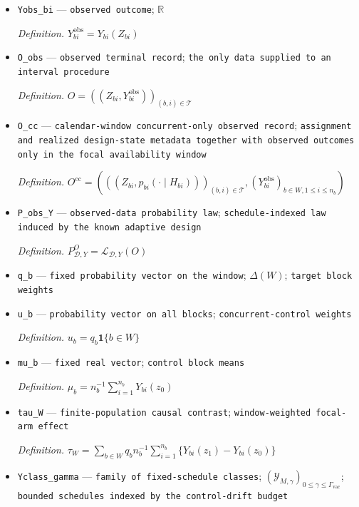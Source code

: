 \documentclass{article}
\begin{document}
\begin{itemize}
  \item \texttt{Yobs\_\allowbreak{}bi} --- \texttt{observed outcome}; \(\mathbb R\)
  \par\smallskip\noindent\emph{Definition.} \(Y^{\mathrm{obs}}_{bi}=Y_{bi}(Z_{bi})\)
  \item \texttt{O\_\allowbreak{}obs} --- \texttt{observed terminal record}; \texttt{the only data supplied to an interval procedure}
  \par\smallskip\noindent\emph{Definition.} \(O=((Z_{bi},Y^{\mathrm{obs}}_{bi}))_{(b,i)\in\mathcal T}\)
  \item \texttt{O\_\allowbreak{}cc} --- \texttt{calendar-\allowbreak{}window concurrent-\allowbreak{}only observed record}; \texttt{assignment and realized design-\allowbreak{}state metadata together with observed outcomes only in the focal availability window}
  \par\smallskip\noindent\emph{Definition.} \(O^{\mathrm{cc}}=(((Z_{bi},p_{bi}(\cdot\mid H_{bi})))_{(b,i)\in\mathcal T},(Y^{\mathrm{obs}}_{bi})_{b\in W,1\le i\le n_b})\)
  \item \texttt{P\_\allowbreak{}obs\_\allowbreak{}Y} --- \texttt{observed-\allowbreak{}data probability law}; \texttt{schedule-\allowbreak{}indexed law induced by the known adaptive design}
  \par\smallskip\noindent\emph{Definition.} \(P_{\mathcal D,Y}^{O}=\mathcal L_{\mathcal D,Y}(O)\)
  \item \texttt{q\_\allowbreak{}b} --- \texttt{fixed probability vector on the window}; \(\Delta(W)\); \texttt{target block weights}
  \item \texttt{u\_\allowbreak{}b} --- \texttt{probability vector on all blocks}; \texttt{concurrent-\allowbreak{}control weights}
  \par\smallskip\noindent\emph{Definition.} \(u_b=q_b\mathbf 1\{b\in W\}\)
  \item \texttt{mu\_\allowbreak{}b} --- \texttt{fixed real vector}; \texttt{control block means}
  \par\smallskip\noindent\emph{Definition.} \(\mu_b=n_b^{-1}\sum_{i=1}^{n_b}Y_{bi}(z_0)\)
  \item \texttt{tau\_\allowbreak{}W} --- \texttt{finite-\allowbreak{}population causal contrast}; \texttt{window-\allowbreak{}weighted focal-\allowbreak{}arm effect}
  \par\smallskip\noindent\emph{Definition.} \(\tau_W=\sum_{b\in W}q_b n_b^{-1}\sum_{i=1}^{n_b}\{Y_{bi}(z_1)-Y_{bi}(z_0)\}\)
  \item \texttt{Yclass\_\allowbreak{}gamma} --- \texttt{family of fixed-\allowbreak{}schedule classes}; \((\mathcal Y_{M,\gamma})_{0\le\gamma\le\Gamma_{\mathrm{vac}}}\); \texttt{bounded schedules indexed by the control-\allowbreak{}drift budget}

\end{itemize}
\end{document}
